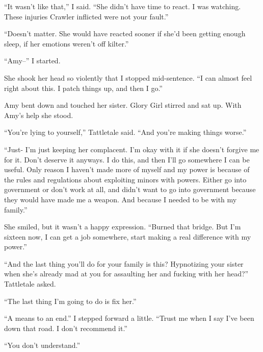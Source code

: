 ``It wasn't like that,'' I said.  ``She didn't have time to react.  I was watching.  These injuries Crawler inflicted were not your fault.''



``Doesn't matter.  She would have reacted sooner if she'd been getting enough sleep, if her emotions weren't off kilter.''



``Amy--'' I started.



She shook her head so violently that I stopped mid-sentence.  ``I can almost feel right about this.  I patch things up, and then I go.''



Amy bent down and touched her sister.  Glory Girl stirred and sat up.  With Amy's help she stood.



``You're lying to yourself,'' Tattletale said.  ``And you're making things worse.''



``Just- I'm just keeping her complacent.  I'm okay with it if she doesn't forgive me for it.  Don't deserve it anyways.  I do this, and then I'll go somewhere I can be useful.  Only reason I haven't made more of myself and my power is because of the rules and regulations about exploiting minors with powers.  Either go into government or don't work at all, and didn't want to go into government because they would have made me a weapon.  And because I needed to be with my family.''



She smiled, but it wasn't a happy expression.  ``Burned that bridge.  But I'm sixteen now, I can get a job somewhere, start making a real difference with my power.''



``And the last thing you'll do for your family is this?  Hypnotizing your sister when she's already mad at you for assaulting her and fucking with her head?''  Tattletale asked.



``The last thing I'm going to do is fix her.''



``A means to an end.''  I stepped forward a little. ``Trust me when I say I've been down that road.  I don't recommend it.''



``You don't understand.''



